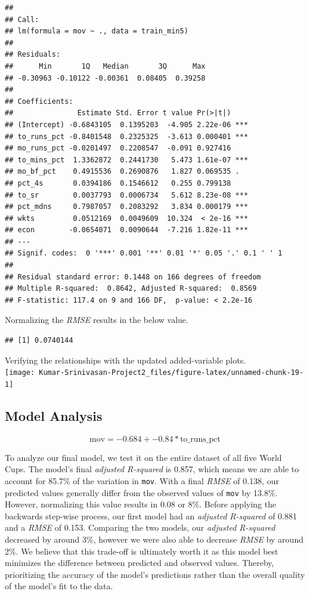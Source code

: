 \documentclass[
]{article}
\begin{document}
\begin{verbatim}
## 
## Call:
## lm(formula = mov ~ ., data = train_min5)
## 
## Residuals:
##      Min       1Q   Median       3Q      Max 
## -0.30963 -0.10122 -0.00361  0.08405  0.39258 
## 
## Coefficients:
##               Estimate Std. Error t value Pr(>|t|)    
## (Intercept) -0.6843105  0.1395203  -4.905 2.22e-06 ***
## to_runs_pct -0.8401548  0.2325325  -3.613 0.000401 ***
## mo_runs_pct -0.0201497  0.2208547  -0.091 0.927416    
## to_mins_pct  1.3362872  0.2441730   5.473 1.61e-07 ***
## mo_bf_pct    0.4915536  0.2690876   1.827 0.069535 .  
## pct_4s       0.0394186  0.1546612   0.255 0.799138    
## to_sr        0.0037793  0.0006734   5.612 8.23e-08 ***
## pct_mdns     0.7987057  0.2083292   3.834 0.000179 ***
## wkts         0.0512169  0.0049609  10.324  < 2e-16 ***
## econ        -0.0654071  0.0090644  -7.216 1.82e-11 ***
## ---
## Signif. codes:  0 '***' 0.001 '**' 0.01 '*' 0.05 '.' 0.1 ' ' 1
## 
## Residual standard error: 0.1448 on 166 degrees of freedom
## Multiple R-squared:  0.8642, Adjusted R-squared:  0.8569 
## F-statistic: 117.4 on 9 and 166 DF,  p-value: < 2.2e-16
\end{verbatim}

Normalizing the \emph{RMSE} results in the below value.

\begin{verbatim}
## [1] 0.0740144
\end{verbatim}

Verifying the relationships with the updated added-variable plots.\\

\texttt{[image: Kumar-Srinivasan-Project2\_files/figure-latex/unnamed-chunk-19-1]}

\hypertarget{model-analysis}{%
\subsection{Model Analysis}\label{model-analysis}}

\[
\text{mov} = -0.684 + -0.84*\text{to_runs_pct}
\]

To analyze our final model, we test it on the entire dataset of all five
World Cups. The model's final \emph{adjusted R-squared} is 0.857, which
means we are able to account for 85.7\% of the variation in
\texttt{mov}. With a final \emph{RMSE} of 0.138, our predicted values
generally differ from the observed values of \texttt{mov} by 13.8\%.
However, normalizing this value results in 0.08 or 8\%. Before applying
the backwards step-wise process, our first model had an \emph{adjusted
R-squared} of 0.881 and a \emph{RMSE} of 0.153. Comparing the two
models, our \emph{adjusted R-squared} decreased by around 3\%, however
we were also able to decrease \emph{RMSE} by around 2\%. We believe that
this trade-off is ultimately worth it as this model best minimizes the
difference between predicted and observed values. Thereby, prioritizing
the accuracy of the model's predictions rather than the overall quality
of the model's fit to the data.
\end{document}
